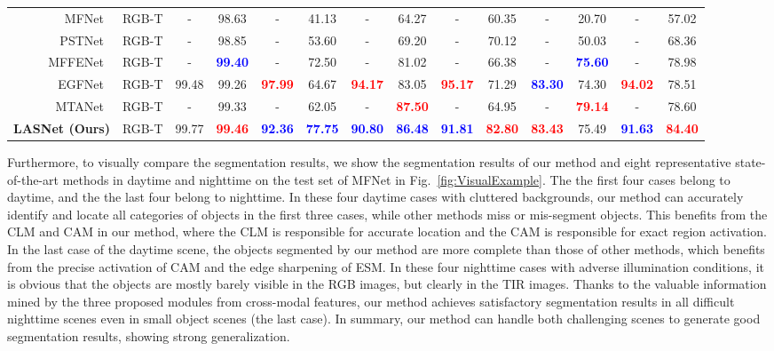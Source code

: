 \documentclass[journal]{IEEEtran}
\begin{document}
\begin{table*}[t!]
\begin{tabular}{r|c|cccccccccccc}
\hline MFNet~\cite{2017MFNet}            & RGB-T & - & 98.63 & - & 41.13 & - & 64.27 & - & 60.35 & - & 20.70 & - & 57.02 \\	
PSTNet~\cite{2020PSTNet}           & RGB-T & - & 98.85 & - & 53.60 & - & 69.20 & - & 70.12 & - & 50.03 & - & 68.36 \\	
MFFENet~\cite{2022MFFENet}       & RGB-T & - & \textcolor{blue}{\textbf{99.40}} & - & 72.50 & - & 81.02 & - & 66.38 & - & \textcolor{blue}{\textbf{75.60}} & - & 78.98 \\	
EGFNet~\cite{2022EGFNet}           & RGB-T & 99.48 & 99.26 & \textcolor{red}{\textbf{97.99}} & 64.67 & \textcolor{red}{\textbf{94.17}} & 83.05 & \textcolor{red}{\textbf{95.17}} & 71.29 & \textcolor{blue}{\textbf{83.30}} & 74.30 & \textcolor{red}{\textbf{94.02}} & 78.51 \\
MTANet~\cite{2022MTANet}            & RGB-T & - & 99.33 & - & 62.05 & - & \textcolor{red}{\textbf{87.50}} & - & 64.95 & - & \textcolor{red}{\textbf{79.14}} & - & 78.60 \\

\hline
\hline
\textbf{LASNet (Ours)}		 & RGB-T & 99.77 & \textcolor{red}{\textbf{99.46}} & \textcolor{blue}{\textbf{92.36}} & \textcolor{blue}{\textbf{77.75}} & \textcolor{blue}{\textbf{90.80}} & \textcolor{blue}{\textbf{86.48}} & \textcolor{blue}{\textbf{91.81}} & \textcolor{red}{\textbf{82.80}} & \textcolor{red}{\textbf{83.43}} & 75.49 & \textcolor{blue}{\textbf{91.63}} & \textcolor{red}{\textbf{84.40}} \\
\toprule[1pt]
\end{tabular}
\end{table*}



Furthermore, to visually compare the segmentation results, we show the segmentation results of our method and eight representative state-of-the-art methods in daytime and nighttime on the test set of MFNet in Fig.~\ref{fig:VisualExample}.
The the first four cases belong to daytime, and the the last four belong to nighttime.
In these four daytime cases with cluttered backgrounds, our method can accurately identify and locate all categories of objects in the first three cases, while other methods miss or mis-segment objects.
This benefits from the CLM and CAM in our method, where the CLM is responsible for accurate location and the CAM is responsible for exact region activation.
In the last case of the daytime scene, the objects segmented by our method are more complete than those of other methods, which benefits from the precise activation of CAM and the edge sharpening of ESM.
In these four nighttime cases with adverse illumination conditions, it is obvious that the objects are mostly barely visible in the RGB images, but clearly in the TIR images.
Thanks to the valuable information mined by the three proposed modules from cross-modal features, our method achieves satisfactory segmentation results in all difficult nighttime scenes even in small object scenes (the last case).
In summary, our method can handle both challenging scenes to generate good segmentation results, showing strong generalization.
\end{document}
